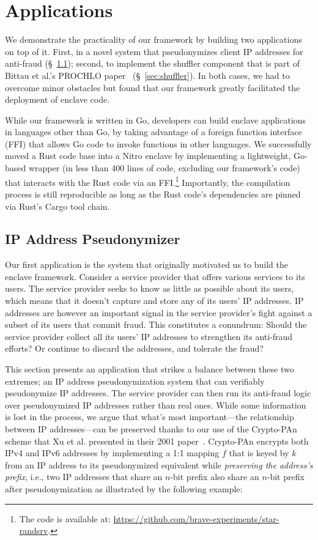 \section{Applications}
\label{sec:applications}

We demonstrate the practicality of our framework by building two applications on
top of it.  First, in a novel system that pseudonymizes client IP addresses for
anti-fraud (\S~\ref{sec:pseudonymization}); second, to implement the shuffler
component that is part of Bittau et al.'s PROCHLO paper~\cite{Bittau2017a}
(\S~\ref{sec:shuffler}).  In both cases, we had to overcome minor obstacles but
found that our framework greatly facilitated the deployment of enclave code.

While our framework is written in Go, developers can build enclave applications
in languages other than Go, by taking advantage of a foreign function interface
(FFI) that allows Go code to invoke functions in other languages.  We
successfully moved a Rust code base into a Nitro enclave by implementing a
lightweight, Go-based wrapper (in less than 400 lines of code, excluding our
framework's code) that interacts with the Rust code via an FFI.\footnote{The
code is available at: \url{https://github.com/brave-experiments/star-randsrv}.}
Importantly, the compilation process is still reproducible as long
as the Rust code's dependencies are pinned via Rust's Cargo tool chain.

\subsection{IP Address Pseudonymizer}
\label{sec:pseudonymization}

Our first application is the system that originally motivated us to build the
enclave framework. Consider a service provider that offers various services to
its users.  The service provider seeks to know as little as possible about its
users, which means that it doesn't capture and store any of its users' IP
addresses.  IP addresses are however an important signal in the service
provider's fight against a subset of its users that commit fraud.  This
constitutes a conundrum: Should the service provider collect all its users' IP
addresses to strengthen its anti-fraud efforts?  Or continue to discard the
addresses, and tolerate the fraud?

This section presents an application that strikes a balance between these two
extremes; an IP address pseudonymization system that can verifiably pseudonymize
IP addresses.  The service provider can then run its anti-fraud logic over
pseudonymized IP addresses rather than real ones.  While some information is
lost in the process, we argue that what's most important---the relationship
between IP addresses---can be preserved thanks to our use of the Crypto-PAn
scheme that Xu et al. presented in their 2001 paper~\cite{Xu01a}.  Crypto-PAn
encrypts both IPv4 and IPv6 addresses by implementing a 1:1 mapping $f$ that is
keyed by $k$ from an IP address to its pseudonymized equivalent while
\emph{preserving the address's prefix}, i.e., two IP addresses that share an
$n$-bit prefix also share an $n$-bit prefix after pseudonymization as
illustrated by the following example:

